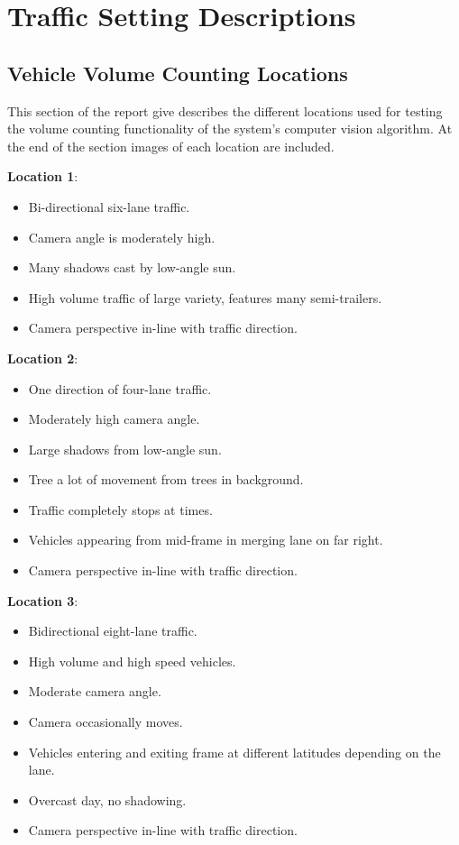 \chapter{Traffic Setting Descriptions}

\section{Vehicle Volume Counting Locations}
\label{section:traffic_descriptors}

This section of the report give describes the different locations used for testing the volume counting functionality of the system's computer vision algorithm. At the end of the section images of each location are included.

\textbf{Location 1}: 

\begin{itemize}
    \item Bi-directional six-lane traffic.
    \item Camera angle is moderately high. 
    \item Many shadows cast by low-angle sun.
    \item High volume traffic of large variety, features many semi-trailers. 
    \item Camera perspective in-line with traffic direction.
\end{itemize}
 

\textbf{Location 2}:

\begin{itemize}
    \item One direction of four-lane traffic.
    \item Moderately high camera angle.
    \item Large shadows from low-angle sun.
    \item Tree a lot of movement from trees in background.
    \item Traffic completely stops at times.
    \item Vehicles appearing from mid-frame in merging lane on far right.
    \item Camera perspective in-line with traffic direction.
\end{itemize}


\textbf{Location 3}: 

\begin{itemize}
    \item Bidirectional eight-lane traffic.
    \item High volume and high speed vehicles.
    \item Moderate camera angle.
    \item Camera occasionally moves.
    \item Vehicles entering and exiting frame at different latitudes depending on the lane.
    \item Overcast day, no shadowing. 
    \item Camera perspective in-line with traffic direction.
\end{itemize}


